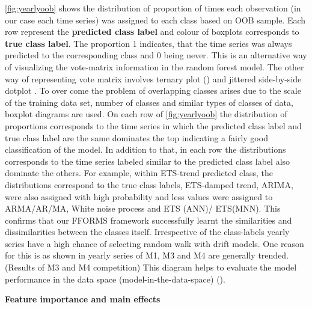 \documentclass[11pt,a4paper,]{article}
\theoremstyle{definition}
\theoremstyle{definition}
\theoremstyle{definition}
\theoremstyle{remark}
\begin{document}
\autoref{fig:yearlyoob} shows the distribution of proportion of times
each observation (in our case each time series) was assigned to each
class based on OOB sample. Each row represent the \textbf{predicted
class label} and colour of boxplots corresponds to \textbf{true class
label}. The proportion 1 indicates, that the time series was always
predicted to the corresponding class and 0 being never. This is an
alternative way of visualizing the vote-matrix information in the random
forest model. The other way of representing vote matrix involves ternary
plot (\textcite{sutherland2000orca}) and jittered side-by-side dotplot
\autocites{ehrlinger2015ggrandomforests}{da2017interactive}. To over
come the problem of overlapping classes arises due to the scale of the
training data set, number of classes and similar types of classes of
data, boxplot diagrams are used. On each row of \autoref{fig:yearlyoob}
the distribution of proportions corresponds to the time series in which
the predicted class label and true class label are the same dominates
the top indicating a fairly good classification of the model. In
addition to that, in each row the distributions corresponds to the time
series labeled similar to the predicted class label also dominate the
others. For example, within ETS-trend predicted class, the distributions
correspond to the true class labels, ETS-damped trend, ARIMA, were also
assigned with high probability and less values were assigned to
ARMA/AR/MA, White noise process and ETS (ANN)/ ETS(MNN). This confirms
that our FFORMS framework successfully learnt the similarities and
dissimilarities between the classes itself. Irrespective of the
class-labels yearly series have a high chance of selecting random walk
with drift models. One reason for this is as shown in
\textcite{kang2018efficient} yearly series of M1, M3 and M4 are
generally trended. (Results of M3 and M4 competition) This diagram helps
to evaluate the model performance in the data space
(model-in-the-data-space) (\textcite{da2017interactive}).

\textbf{Feature importance and main effects}
\end{document}
